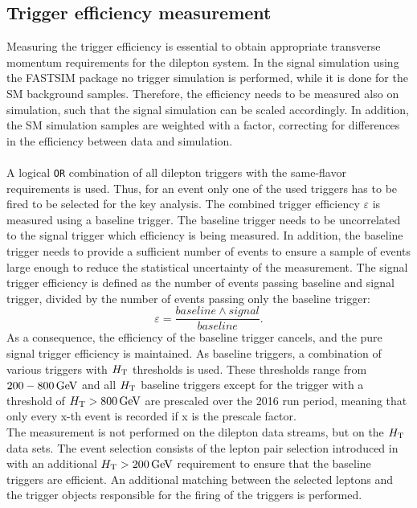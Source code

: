 \subsection*{Trigger efficiency measurement}
Measuring the trigger efficiency is essential to obtain appropriate transverse momentum requirements for the dilepton system. In the signal simulation using the \textsc{FASTSIM} package no trigger simulation is performed, while it is done for the SM background samples. Therefore, the efficiency needs to be measured also on simulation, such that the signal simulation can be scaled accordingly. In addition, the SM simulation samples are weighted with a factor, correcting for differences in the efficiency between data and simulation.\\\\
A logical \texttt{OR} combination of all dilepton triggers with the same-flavor requirements is used. Thus, for an event only one of the used triggers has to be fired to be selected for the key analysis. The combined trigger efficiency $\varepsilon$ is measured using a baseline trigger. The baseline trigger needs to be uncorrelated to the signal trigger which efficiency is being measured. In addition, the baseline trigger needs to provide a sufficient number of events to ensure a sample of events large enough to reduce the statistical uncertainty of the measurement. The signal trigger efficiency is defined as the number of events passing baseline and signal trigger, divided by the number of events passing only the baseline trigger:
\begin{equation}
 \varepsilon=\frac{baseline \wedge signal}{baseline}.
\end{equation}
As a consequence, the efficiency of the baseline trigger cancels, and the pure signal trigger efficiency is maintained. As baseline triggers, a combination of various triggers with $H_{\mathrm{T}}$ thresholds is used. These thresholds range from $200-800\,\text{Ge\hspace{-.08em}V}$ and all $H_{\mathrm{T}}$ baseline triggers except for the trigger with a threshold of $H_{\mathrm{T}}>800\,\text{Ge\hspace{-.08em}V}$ are prescaled over the 2016 run period, meaning that only every x-th event is recorded if x is the prescale factor.\\
The measurement is not performed on the dilepton data streams, but on the $H_{\mathrm{T}}$ data sets. The event selection consists of the lepton pair selection introduced in  with an additional $H_{\mathrm{T}}>200\,\text{Ge\hspace{-.08em}V}$ requirement to ensure that the baseline triggers are efficient. An additional matching between the selected leptons and the trigger objects responsible for the firing of the triggers is performed.\\\\
